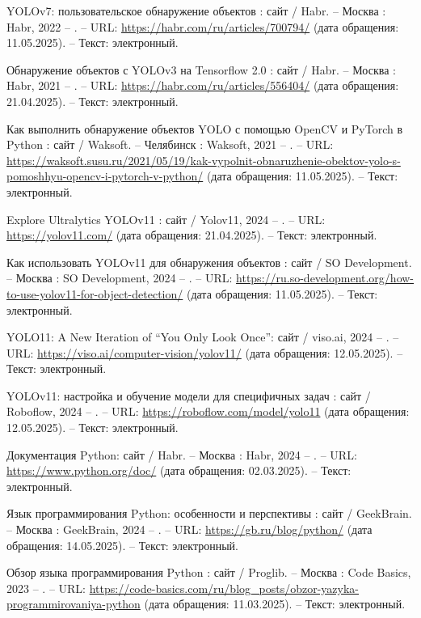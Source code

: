 \begin{thebibliography}{9}
	 YOLOv7: пользовательское обнаружение объектов : сайт / Habr. – Москва : Habr, 2022 – . – URL: \url{https://habr.com/ru/articles/700794/} (дата обращения: 11.05.2025). – Текст: электронный.
	
	 Обнаружение объектов с YOLOv3 на Tensorflow 2.0 : сайт / Habr. – Москва : Habr, 2021 – . – URL: \url{https://habr.com/ru/articles/556404/} (дата обращения: 21.04.2025). – Текст: электронный.
	
	 Как выполнить обнаружение объектов YOLO с помощью OpenCV и PyTorch в Python : сайт / Waksoft. – Челябинск : Waksoft, 2021 – . – URL: \url{https://waksoft.susu.ru/2021/05/19/kak-vypolnit-obnaruzhenie-obektov-yolo-s-pomoshhyu-opencv-i-pytorch-v-python/} (дата обращения: 11.05.2025). – Текст: электронный.
	
	 Explore Ultralytics YOLOv11 : сайт / Yolov11, 2024 – . – URL: \url{https://yolov11.com/} (дата обращения: 21.04.2025). – Текст: электронный.
	
	 Как использовать YOLOv11 для обнаружения объектов : сайт / SO Development. – Москва : SO Development, 2024 – . – URL: \url{https://ru.so-development.org/how-to-use-yolov11-for-object-detection/} (дата обращения: 11.05.2025). – Текст: электронный.
	
	 YOLO11: A New Iteration of “You Only Look Once”: сайт / viso.ai, 2024 – . – URL: \url{https://viso.ai/computer-vision/yolov11/} (дата обращения: 12.05.2025). – Текст: электронный.
	
	 YOLOv11: настройка и обучение модели для специфичных задач : сайт / Roboflow, 2024 – . – URL: \url{https://roboflow.com/model/yolo11} (дата обращения: 12.05.2025). – Текст: электронный.

	 Документация Python: сайт / Habr. – Москва : Habr, 2024 – . – URL: \url{https://www.python.org/doc/} (дата обращения: 02.03.2025). – Текст: электронный.
	
	 Язык программирования Python: особенности и перспективы : сайт / GeekBrain. – Москва : GeekBrain, 2024 – . – URL: \url{https://gb.ru/blog/python/} (дата обращения: 14.05.2025). – Текст: электронный.
	
	 Обзор языка программирования Python : сайт / Proglib. – Москва : Code Basics, 2023 – . – URL: \url{https://code-basics.com/ru/blog_posts/obzor-yazyka-programmirovaniya-python} (дата обращения: 11.03.2025). – Текст: электронный.
	

\end{thebibliography}
